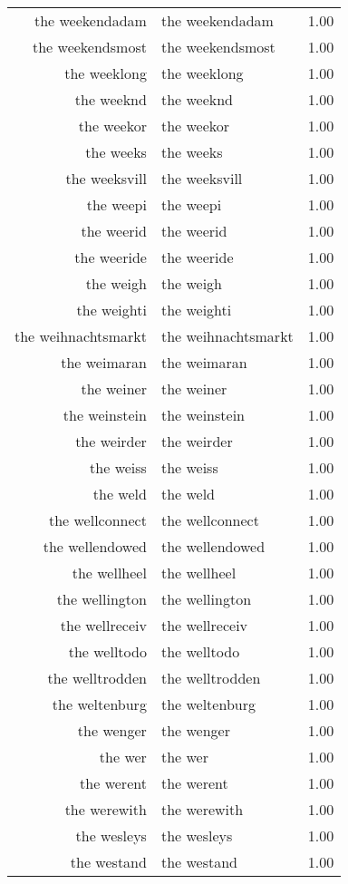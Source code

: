 \begin{table}[ht]
\begin{tabular}{rlr}
  the weekendadam & the weekendadam & 1.00 \\ 
  the weekendsmost & the weekendsmost & 1.00 \\ 
  the weeklong & the weeklong & 1.00 \\ 
  the weeknd & the weeknd & 1.00 \\ 
  the weekor & the weekor & 1.00 \\ 
  the weeks & the weeks & 1.00 \\ 
  the weeksvill & the weeksvill & 1.00 \\ 
  the weepi & the weepi & 1.00 \\ 
  the weerid & the weerid & 1.00 \\ 
  the weeride & the weeride & 1.00 \\ 
  the weigh & the weigh & 1.00 \\ 
  the weighti & the weighti & 1.00 \\ 
  the weihnachtsmarkt & the weihnachtsmarkt & 1.00 \\ 
  the weimaran & the weimaran & 1.00 \\ 
  the weiner & the weiner & 1.00 \\ 
  the weinstein & the weinstein & 1.00 \\ 
  the weirder & the weirder & 1.00 \\ 
  the weiss & the weiss & 1.00 \\ 
  the weld & the weld & 1.00 \\ 
  the wellconnect & the wellconnect & 1.00 \\ 
  the wellendowed & the wellendowed & 1.00 \\ 
  the wellheel & the wellheel & 1.00 \\ 
  the wellington & the wellington & 1.00 \\ 
  the wellreceiv & the wellreceiv & 1.00 \\ 
  the welltodo & the welltodo & 1.00 \\ 
  the welltrodden & the welltrodden & 1.00 \\ 
  the weltenburg & the weltenburg & 1.00 \\ 
  the wenger & the wenger & 1.00 \\ 
  the wer & the wer & 1.00 \\ 
  the werent & the werent & 1.00 \\ 
  the werewith & the werewith & 1.00 \\ 
  the wesleys & the wesleys & 1.00 \\ 
  the westand & the westand & 1.00 \\ 

\end{tabular}
\end{table}
